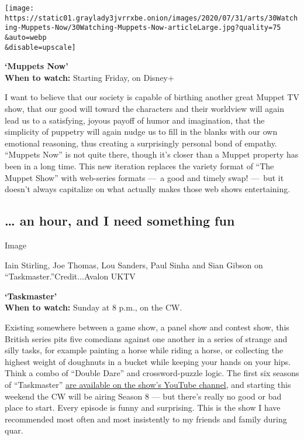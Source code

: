 \texttt{[image: https://static01.graylady3jvrrxbe.onion/images/2020/07/31/arts/30Watching-Muppets-Now/30Watching-Muppets-Now-articleLarge.jpg?quality=75\\\&auto=webp\\\&disable=upscale]}

\textbf{`Muppets Now'}\\
\textbf{When to watch:} Starting Friday, on Disney+

I want to believe that our society is capable of birthing another great
Muppet TV show, that our good will toward the characters and their
worldview will again lead us to a satisfying, joyous payoff of humor and
imagination, that the simplicity of puppetry will again nudge us to fill
in the blanks with our own emotional reasoning, thus creating a
surprisingly personal bond of empathy. ``Muppets Now'' is not quite
there, though it's closer than a Muppet property has been in a long
time. This new iteration replaces the variety format of ``The Muppet
Show'' with web-series formats ---~a good and timely swap! ---~but it
doesn't always capitalize on what actually makes those web shows
entertaining.

\hypertarget{-an-hour-and-i-need-something-fun}{%
\subsection{\ldots{} an hour, and I need something
fun}\label{-an-hour-and-i-need-something-fun}}

Image

Iain Stirling, Joe Thomas, Lou Sanders, Paul Sinha and Sian Gibson on
``Taskmaster.''Credit...Avalon UKTV

\textbf{`Taskmaster'}\\
\textbf{When to watch:} Sunday at 8 p.m., on the CW.

Existing somewhere between a game show, a panel show and contest show,
this British series pits five comedians against one another in a series
of strange and silly tasks, for example painting a horse while riding a
horse, or collecting the highest weight of doughnuts in a bucket while
keeping your hands on your hips. Think a combo of ``Double Dare'' and
crossword-puzzle logic. The first six seasons of ``Taskmaster''
\href{https://www.youtube.com/channel/UCT5C7yaO3RVuOgwP8JVAujQ}{are
available on the show's YouTube channel}, and starting this weekend the
CW will be airing Season 8 --- but there's really no good or bad place
to start. Every episode is funny and surprising. This is the show I have
recommended most often and most insistently to my friends and family
during quar.

